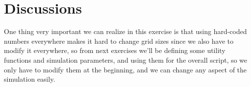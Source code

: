 \documentclass[titlepage,12pt]{unisubmission}
\begin{document}
\section{Discussions}
\label{sec:orge708848}
One thing very important we can realize in this exercise is that using hard-coded numbers everywhere makes it hard to change grid sizes since we also have to modify it everywhere, so from next exercises we'll be defining some utility functions and simulation parameters, and using them for the overall script, so we only have to modify them at the beginning, and we can change any aspect of the simulation easily.
\end{document}
